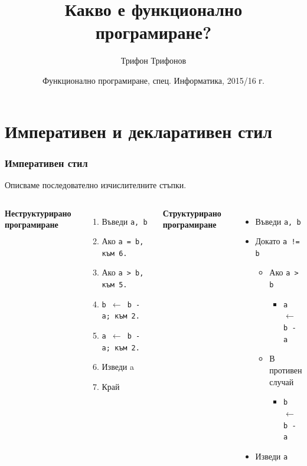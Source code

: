 \documentclass{beamer}
\title{Какво е функционално програмиране?}
\author{Трифон Трифонов}
\date{\small Функционално програмиране, спец. Информатика, 2015/16 г.}
\begin{document}
\begin{frame}
  \titlepage
\end{frame}

\section*{Императивен и декларативен стил}

\begin{frame}
  \frametitle{Императивен стил}

  Описваме последователно изчислителните стъпки.

  \begin{columns}[t,onlytextwidth]

    \textbf{Неструктурирано програмиране}

    \begin{enumerate}
    \item Въведи \tt a, \tt b
    \item Ако \tt{a = b}, към 6.
    \item Ако \tt{a > b}, към 5.
    \item \tt{b $\leftarrow$ b - a}; към 2.
    \item \tt{a $\leftarrow$ b - a}; към 2.
    \item Изведи a
    \item Край
    \end{enumerate}


    \textbf{Структурирано програмиране}

    \begin{itemize}
    \item Въведи \tt a, \tt b
    \item Докато \tt{a != b}
      \begin{itemize}
      \item Ако \tt{a > b}
        \begin{itemize}
        \item \tt{a $\leftarrow$ b - a}
        \end{itemize}
      \item В противен случай
        \begin{itemize}
        \item \tt{b $\leftarrow$ b - a}
        \end{itemize}        
      \end{itemize}
    \item Изведи \tt a
    \end{itemize}

  \end{columns}
\end{frame}
\end{document}
